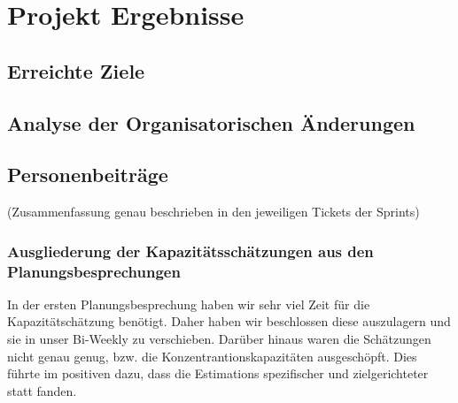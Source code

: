 
\chapter{Projekt Ergebnisse}

\section{Erreichte Ziele}

\section{Analyse der Organisatorischen Änderungen}
\section{Personenbeiträge}
(Zusammenfassung genau beschrieben in den jeweiligen Tickets der Sprints)

\subsection{Ausgliederung der Kapazitätsschätzungen aus den Planungsbesprechungen}

In der ersten Planungsbesprechung haben wir sehr viel Zeit für die Kapazitätschätzung benötigt.
Daher haben wir beschlossen diese auszulagern und sie in unser Bi-Weekly zu verschieben.
Darüber hinaus waren die Schätzungen nicht genau genug, bzw. die Konzentrantionskapazitäten ausgeschöpft.
Dies führte im positiven dazu, dass die Estimations spezifischer und zielgerichteter statt fanden.